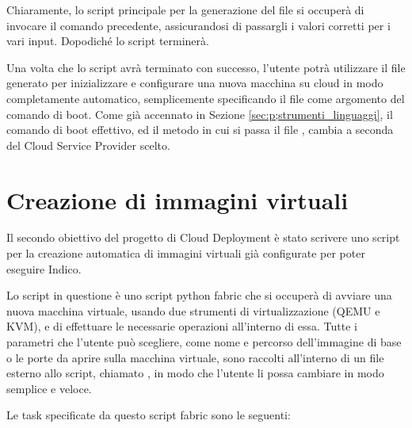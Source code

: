             Chiaramente, lo script principale per la generazione del file  si occuperà di invocare il comando precedente, assicurandosi di passargli i valori corretti per i vari input. Dopodiché lo script terminerà.
            
            Una volta che lo script avrà terminato con successo, l'utente potrà utilizzare il file  generato per inizializzare e configurare una nuova macchina su cloud in modo completamente automatico, semplicemente specificando il file  come argomento del comando di boot. Come già accennato in Sezione \ref{sec:p;strumenti_linguaggi}, il comando di boot effettivo, ed il metodo in cui si passa il file , cambia a seconda del Cloud Service Provider scelto.

    \section{Creazione di immagini virtuali} \label{sec:cd;creazione_immagini_virtuali}
    
        Il secondo obiettivo del progetto di Cloud Deployment è stato scrivere uno script per la creazione automatica di immagini virtuali già configurate per poter eseguire Indico.
        
        Lo script in questione è uno script python fabric che si occuperà di avviare una nuova macchina virtuale, usando due strumenti di virtualizzazione (\ac{QEMU} e \ac{KVM}), e di effettuare le necessarie operazioni all'interno di essa. Tutte i parametri che l'utente può scegliere, come nome e percorso dell'immagine di base o le porte da aprire sulla macchina virtuale, sono raccolti all'interno di un file esterno allo script, chiamato , in modo che l'utente li possa cambiare in modo semplice e veloce.
        
        Le task specificate da questo script fabric sono le seguenti:
        
